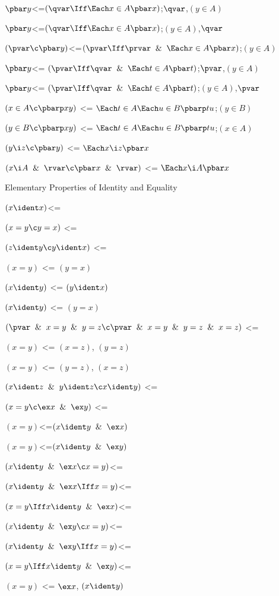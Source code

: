 $\pbar y$<=$(\qvar \Iff \Each x \in A \pbar x)$;$\qvar$,$(y \in A)$

$\pbar y$<=$(\qvar \Iff \Each x \in A \pbar x)$;$(y \in A)$,$\qvar$

$(\pvar \c \pbar y)$<=$(\pvar \Iff \prvar \And \Each x \in A \pbar x )$;$(y \in A)$

$\pbar y$<= $(\pvar \Iff \qvar \And \Each t \in A  \pbar t)$;$\pvar$,$(y \in A)$

$\pbar y$<= $(\pvar \Iff \qvar \And \Each t \in A  \pbar t)$;$(y \in A)$,$\pvar$

$(x \in A \c \pbarp xy)$ <= $\Each t \in A \Each u \in B \pbarp tu$;$(y \in B)$

$(y \in B \c \pbarp xy)$ <= $\Each t \in A \Each u \in B \pbarp tu$;$(x \in A)$

$(y \i z \c \pbar y)$ <= $\Each x \i z \pbar x$

$(x \i A \And \rvar \c \pbar x \And \rvar)$ <= $\Each x \i A \pbar x$
\lineb

Elementary Properties of Identity and Equality
\lineb

$(x \ident x)$<=

$(x = y \c y = x)$ <=

$(z \ident y \c y \ident x)$ <=

$(x = y)$ <= $(y = x)$

$(x \ident y)$ <= $(y \ident x)$

$(x \ident y)$ <= $(y = x)$

$(\pvar \And x = y \And y = z \c \pvar \And x = y \And y = z \And x = z)$ <=

$(x = y)$ <= $(x = z)$, $(y = z)$

$(x = y)$ <= $(y = z)$, $(x = z)$

$(x \ident z \And y \ident z \c x \ident y)$ <=

$(x = y \c \ex x \And \ex y)$ <=

$(x = y)$<=$(x \ident y \And \ex x)$

$(x = y)$<=$(x \ident y \And \ex y)$

$(x \ident y \And \ex x \c x = y)$<=

$(x \ident y \And \ex x \Iff x = y)$<=

$(x = y \Iff x \ident y \And \ex x)$<=

$(x \ident y \And \ex y \c x = y)$<=

$(x \ident y \And \ex y \Iff x = y)$<=

$(x = y \Iff x \ident y \And \ex y)$<=

$(x = y)$ <= $\ex x$, $(x \ident y)$

